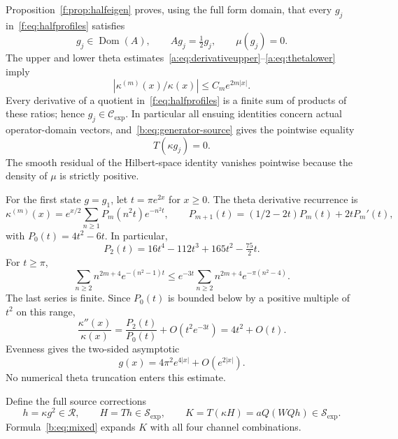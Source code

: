 \documentclass[11pt,a4paper]{article}
\numberwithin{equation}{section}
\theoremstyle{definition}\newtheorem{definition}[theorem]{Definition}
\theoremstyle{remark}\newtheorem{remark}[theorem]{Remark}
\newcommand{\dom}{\operatorname{Dom}}\newcommand{\Var}{\operatorname{Var}}
\newcommand{\RR}{\mathscr R}\newcommand{\SSS}{\mathcal S_{\!\exp}}\newcommand{\CE}{\mathcal C_{\exp}}
\begin{document}
Proposition~\ref{f:prop:halfeigen} proves, using the full form domain, that every $g_j$ in~\eqref{f:eq:halfprofiles} satisfies
\begin{equation}\label{b:eq:actualhalf}
 g_j\in\dom(A),\qquad Ag_j=\tfrac12g_j,\qquad \mu(g_j)=0.
\end{equation}
The upper and lower theta estimates~\eqref{a:eq:derivativeupper}--\eqref{a:eq:thetalower} imply
\begin{equation}\label{b:eq:ratio}
 |\kappa^{(m)}(x)/\kappa(x)|\le C_me^{2m|x|}.
\end{equation}
Every derivative of a quotient in~\eqref{f:eq:halfprofiles} is a finite sum of products of these ratios; hence $g_j\in\CE$. In particular all ensuing identities concern actual operator-domain vectors, and~\eqref{b:eq:generator-source} gives the pointwise equality
\begin{equation}\label{b:eq:halfsource}
 T(\kappa g_j)=0.
\end{equation}
The smooth residual of the Hilbert-space identity vanishes pointwise because the density of $\mu$ is strictly positive.

For the first state $g=g_1$, let $t=\pi e^{2x}$ for $x\ge0$. The theta derivative recurrence is
\begin{equation}\label{b:eq:recurrence}
 \kappa^{(m)}(x)=e^{x/2}\sum_{n\ge1}P_m(n^2t)e^{-n^2t},\qquad
 P_{m+1}(t)=(1/2-2t)P_m(t)+2tP_m'(t),
\end{equation}
with $P_0(t)=4t^2-6t$. In particular,
\[
 P_2(t)=16t^4-112t^3+165t^2-\tfrac{75}{2}t.
\]
For $t\ge\pi$,
\begin{equation}\label{b:eq:thetatail}
 \sum_{n\ge2}n^{2m+4}e^{-(n^2-1)t}
 \le e^{-3t}\sum_{n\ge2}n^{2m+4}e^{-\pi(n^2-4)}.
\end{equation}
The last series is finite. Since $P_0(t)$ is bounded below by a positive multiple of $t^2$ on this range,
\[
 \frac{\kappa''(x)}{\kappa(x)}
  =\frac{P_2(t)}{P_0(t)}+O(t^2e^{-3t})=4t^2+O(t).
\]
Evenness gives the two-sided asymptotic
\begin{equation}\label{b:eq:gasymptotic}
 g(x)=4\pi^2e^{4|x|}+O(e^{2|x|}).
\end{equation}
No numerical theta truncation enters this estimate.

Define the full source corrections
\begin{equation}\label{b:eq:HK}
 h=\kappa g^2\in\RR,\qquad H=Th\in\SSS,\qquad
 K=T(\kappa H)=aQ(WQh)\in\SSS.
\end{equation}
Formula~\eqref{b:eq:mixed} expands $K$ with all four channel combinations.
\end{document}
